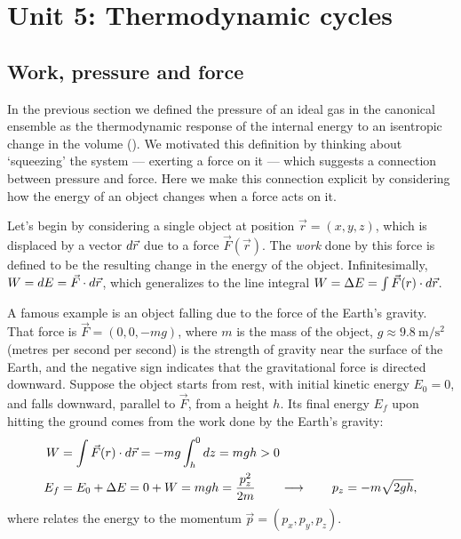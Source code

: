 \renewcommand{\thisunit}{MATH327 Unit 5}
\renewcommand{\moddate}{Last modified 4 Mar.~2025}
\setcounter{section}{5}
\setcounter{subsection}{0}
{}
\section*{Unit 5: Thermodynamic cycles}
\subsection{\label{sec:work}Work, pressure and force}
In the previous section we defined the pressure of an ideal gas in the canonical ensemble as the thermodynamic response of the internal energy to an isentropic change in the volume ().
We motivated this definition by thinking about `squeezing' the system --- exerting a force on it --- which suggests a connection between pressure and force.
Here we make this connection explicit by considering how the energy of an object changes when a force acts on it.

Let's begin by considering a single object at position $\vec r = (x, y, z)$, which is displaced by a vector $\mathop{d\vec r}$ due to a force $\vec F(\vec r)$.
The \emph{work} done by this force is defined to be the resulting change in the energy of the object.
Infinitesimally, $W = \mathop{dE} = \vec F\cdot \mathop{d\vec r}$, which generalizes to the line integral $W = \Delta E = \int \vec F(r)\cdot d\vec r$.

A famous example is an object falling due to the force of the Earth's gravity.
That force is $\vec F = (0, 0, -mg)$, where $m$ is the mass of the object, $g \approx 9.8~\mathrm{m}/\mathrm{s}^2$ (metres per second per second) is the strength of gravity near the surface of the Earth, and the negative sign indicates that the gravitational force is directed downward.
Suppose the object starts from rest, with initial kinetic energy $E_0 = 0$, and falls downward, parallel to $\vec F$, from a height $h$.
Its final energy $E_f$ upon hitting the ground comes from the work done by the Earth's gravity:
\begin{align*}
  W & = \int \vec F(r)\cdot d\vec r = -mg \int_h^0 dz = mgh > 0 \\
  E_f & = E_0 + \Delta E = 0 + W = mgh = \frac{p_z^2}{2m} \qquad \longrightarrow \qquad p_z = -m\sqrt{2gh},
\end{align*}
where  relates the energy to the momentum $\vec p = (p_x, p_y, p_z)$.

